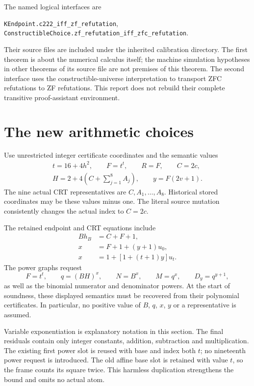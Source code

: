 The named logical interfaces are
\begin{center}\small
\nolinkurl{KEndpoint.c222_iff_zf_refutation},\\
\nolinkurl{ConstructibleChoice.zf_refutation_iff_zfc_refutation}.
\end{center}
Their source files are included under the inherited calibration directory.
The first theorem is about the numerical calculus itself; the machine
simulation hypotheses in other theorems of its source file are not premises
of this theorem. The second interface uses the constructible-universe
interpretation to transport ZFC refutations to ZF refutations. This report
does not rebuild their complete transitive proof-assistant environment.

\section{The new arithmetic choices}\label{sec:choices}

Use unrestricted integer certificate coordinates and the semantic values
\begin{equation}\label{eq:choices}
\begin{gathered}
 t=16+4h^2,\qquad F=t^t,\qquad R=F,\qquad C=2c,\\
 H=2+4\left(C+\sum_{j=1}^{8}A_j\right),\qquad
 y=F(2v+1).
\end{gathered}
\end{equation}
The nine actual CRT representatives are $C,A_1,\ldots,A_8$.
Historical stored coordinates may be these values minus one. The literal
source mutation consistently changes the actual index to $C=2c$.

The retained endpoint and CRT equations include
\begin{align}
 Bh_B&=C+F+1,\label{eq:raw-index}\\
 x&=F+1+(y+1)u_0,\label{eq:first}\\
 x&=1+[1+(t+1)y]u_t.\label{eq:last}
\end{align}
The power graphs request
\[
 F=t^t,\qquad q=(BH)^x,\qquad N=B^x,\qquad
 M=q^x,\qquad D_y=q^{y+1},
\]
as well as the binomial numerator and denominator powers. At the start of
soundness, these displayed semantics must be recovered from their polynomial
certificates. In particular, no positive value of $B$, $q$, $x$, $y$ or a
representative is assumed.

Variable exponentiation is explanatory notation in this section. The final
residuals contain only integer constants, addition, subtraction and
multiplication. The existing first power slot is reused with base and
index both $t$; no nineteenth power request is introduced. The old affine
base slot is retained with value $t$, so the frame counts its square twice.
This harmless duplication strengthens the bound and omits no actual atom.

